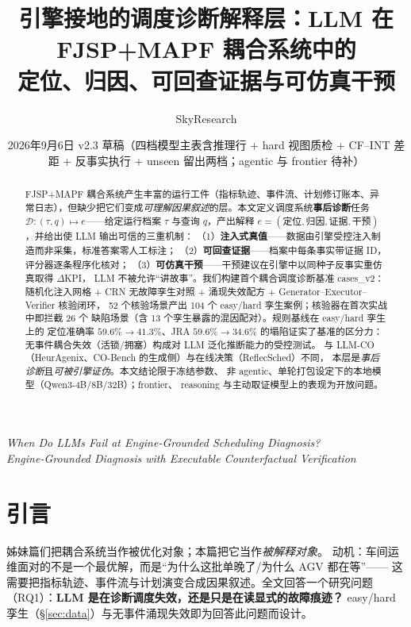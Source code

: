 \documentclass[UTF8,12pt,a4paper]{ctexart}
\title{引擎接地的调度诊断解释层：LLM 在 FJSP+MAPF 耦合系统中的\\定位、归因、可回查证据与可仿真干预}
\author{SkyResearch}
\date{2026年9月6日 \quad v2.3 草稿（四档模型主表含推理行 + hard 视图质检 + CF--INT 差距 + 反事实执行 + unseen 留出两档；agentic 与 frontier 待补）}
\begin{document}
\maketitle
\begin{center}\it\small
When Do LLMs Fail at Engine-Grounded Scheduling Diagnosis?\\
Engine-Grounded Diagnosis with Executable Counterfactual Verification
\end{center}

\begin{abstract}
FJSP+MAPF 耦合系统产生丰富的运行工件（指标轨迹、事件流、计划修订账本、异常日志），但缺少把它们变成\emph{可理解因果叙述}的层。本文定义调度系统\textbf{事后诊断}任务
$\mathcal{D}:(\tau,q)\mapsto e$——给定运行档案 $\tau$ 与查询 $q$，产出解释
$e=(\text{定位},\text{归因},\text{证据},\text{干预})$，并给出使 LLM 输出可信的三重机制：
（1）\textbf{注入式真值}——数据由引擎受控注入制造而非采集，标准答案零人工标注；
（2）\textbf{可回查证据}——档案中每条事实带证据 ID，评分器逐条程序化核对；
（3）\textbf{可仿真干预}——干预建议在引擎中以同种子反事实重仿真取得 $\Delta$KPI，
LLM 不被允许``讲故事''。我们构建首个耦合调度诊断基准 cases\_v2：随机化注入网格 +
CRN 无故障孪生对照 + 涌现失效配方 + Generator--Executor--Verifier 核验闭环，
52 个核验场景产出 104 个 easy/hard 孪生案例；核验器在首次实战中即拦截 26 个
缺陷场景（含 13 个孪生暴露的混因配对）。规则基线在 easy/hard 孪生上的
定位准确率 $59.6\%\to41.3\%$、JRA $59.6\%\to34.6\%$ 的塌陷证实了基准的区分力：
无事件耦合失效（活锁/拥塞）构成对 LLM 泛化推断能力的受控测试。
与 LLM-CO（HeurAgenix、CO-Bench 的生成侧）与在线决策（ReflecSched）不同，
本层是\emph{事后诊断}且\emph{可被引擎证伪}。本文结论限于冻结参数、
非 agentic、单轮打包设定下的本地模型（Qwen3-4B/8B/32B）；frontier、
reasoning 与主动取证模型上的表现为开放问题。
\end{abstract}

\section{引言}

姊妹篇们把耦合系统当作被优化对象；本篇把它当作\emph{被解释对象}。
动机：车间运维面对的不是一个最优解，而是``为什么这批单晚了/为什么 AGV 都在等''——
这需要把指标轨迹、事件流与计划演变合成因果叙述。全文回答一个研究问题
（RQ1）：\textbf{LLM 是在诊断调度失效，还是只是在读显式的故障痕迹？}
easy/hard 孪生（§\ref{sec:data}）与无事件涌现失效即为回答此问题而设计。
\end{document}

